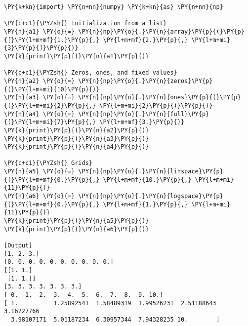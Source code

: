 \begin{Verbatim}[label=\makebox{\url{https://bitbucket.org/lbaldini/programming/src/tip/snippets/numpy\_arrays.py}},commandchars=\\\{\}]
\PY{k+kn}{import} \PY{n+nn}{numpy} \PY{k+kn}{as} \PY{n+nn}{np}

\PY{c+c1}{\PYZsh{} Initialization from a list}
\PY{n}{a1} \PY{o}{=} \PY{n}{np}\PY{o}{.}\PY{n}{array}\PY{p}{(}\PY{p}{[}\PY{l+m+mf}{1.}\PY{p}{,} \PY{l+m+mf}{2.}\PY{p}{,} \PY{l+m+mi}{3}\PY{p}{]}\PY{p}{)}
\PY{k}{print}\PY{p}{(}\PY{n}{a1}\PY{p}{)}

\PY{c+c1}{\PYZsh{} Zeros, ones, and fixed values}
\PY{n}{a2} \PY{o}{=} \PY{n}{np}\PY{o}{.}\PY{n}{zeros}\PY{p}{(}\PY{l+m+mi}{10}\PY{p}{)}
\PY{n}{a3} \PY{o}{=} \PY{n}{np}\PY{o}{.}\PY{n}{ones}\PY{p}{(}\PY{p}{(}\PY{l+m+mi}{2}\PY{p}{,} \PY{l+m+mi}{2}\PY{p}{)}\PY{p}{)}
\PY{n}{a4} \PY{o}{=} \PY{n}{np}\PY{o}{.}\PY{n}{full}\PY{p}{(}\PY{l+m+mi}{7}\PY{p}{,} \PY{l+m+mf}{3.}\PY{p}{)}
\PY{k}{print}\PY{p}{(}\PY{n}{a2}\PY{p}{)}
\PY{k}{print}\PY{p}{(}\PY{n}{a3}\PY{p}{)}
\PY{k}{print}\PY{p}{(}\PY{n}{a4}\PY{p}{)}

\PY{c+c1}{\PYZsh{} Grids}
\PY{n}{a5} \PY{o}{=} \PY{n}{np}\PY{o}{.}\PY{n}{linspace}\PY{p}{(}\PY{l+m+mf}{0.}\PY{p}{,} \PY{l+m+mf}{10.}\PY{p}{,} \PY{l+m+mi}{11}\PY{p}{)}
\PY{n}{a6} \PY{o}{=} \PY{n}{np}\PY{o}{.}\PY{n}{logspace}\PY{p}{(}\PY{l+m+mf}{0.}\PY{p}{,} \PY{l+m+mf}{1.}\PY{p}{,} \PY{l+m+mi}{11}\PY{p}{)}
\PY{k}{print}\PY{p}{(}\PY{n}{a5}\PY{p}{)}
\PY{k}{print}\PY{p}{(}\PY{n}{a6}\PY{p}{)}

[Output]
[1. 2. 3.]
[0. 0. 0. 0. 0. 0. 0. 0. 0. 0.]
[[1. 1.]
 [1. 1.]]
[3. 3. 3. 3. 3. 3. 3.]
[ 0.  1.  2.  3.  4.  5.  6.  7.  8.  9. 10.]
[ 1.          1.25892541  1.58489319  1.99526231  2.51188643  3.16227766
  3.98107171  5.01187234  6.30957344  7.94328235 10.        ]
\end{Verbatim}